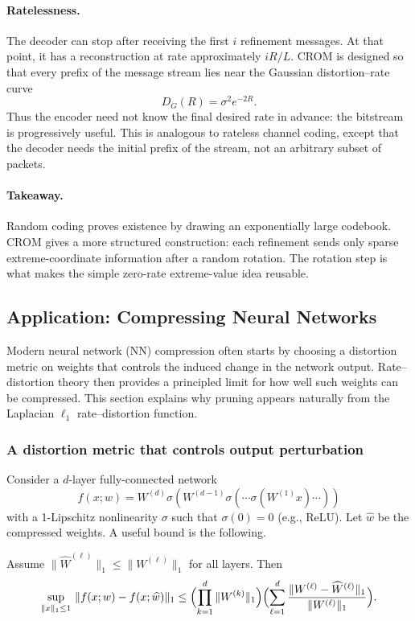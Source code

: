 \paragraph{Ratelessness.}
The decoder can stop after receiving the first $i$ refinement messages.
At that point, it has a reconstruction at rate approximately $iR/L$.
CROM is designed so that every prefix of the message stream lies near the Gaussian distortion--rate curve
\[
    D_G(R)=\sigma^2e^{-2R}.
\]
Thus the encoder need not know the final desired rate in advance: the bitstream is progressively useful.
This is analogous to rateless channel coding, except that the decoder needs the initial prefix of the stream, not an arbitrary subset of packets.

\paragraph{Takeaway.}
Random coding proves existence by drawing an exponentially large codebook.
CROM gives a more structured construction: each refinement sends only sparse extreme-coordinate information after a random rotation.
The rotation step is what makes the simple zero-rate extreme-value idea reusable.

\subsection{Application: Compressing Neural Networks}
\label{sec:nn-compress}

Modern neural network (NN) compression often starts by choosing a distortion metric on weights that controls the induced change in the network output.
Rate--distortion theory then provides a principled limit for how well such weights can be compressed.
This section explains why pruning appears naturally from the Laplacian $\ell_1$ rate--distortion function.

\subsubsection*{A distortion metric that controls output perturbation}

Consider a $d$-layer fully-connected network
\[
    f(x;w)=W^{(d)}\sigma(W^{(d-1)}\sigma(\cdots \sigma(W^{(1)}x)\cdots))
\]
with a 1-Lipschitz nonlinearity $\sigma$ such that $\sigma(0)=0$ (e.g., ReLU).
Let $\widehat w$ be the compressed weights.
A useful bound is the following.

\begin{theorem}
\label{thm:nn-l1-bound}
Assume $\|\widehat W^{(\ell)}\|_1\le \|W^{(\ell)}\|_1$ for all layers.
Then
\begin{equation}
\sup_{\|x\|_1\le 1}\,\|f(x;w)-f(x;\widehat w)\|_1
\le
\Bigl(\prod_{k=1}^{d}\|W^{(k)}\|_1\Bigr)
\Bigl(\sum_{\ell=1}^{d}\frac{\|W^{(\ell)}-\widehat W^{(\ell)}\|_1}{\|W^{(\ell)}\|_1}\Bigr).
\label{eq:nn-output-bound}
\end{equation}
\end{theorem}

